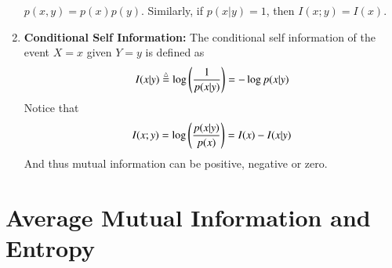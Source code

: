 \documentclass[journal,12pt,twocolumn]{IEEEtran}
\renewcommand\thesection{\arabic{section}}
\begin{document}
\begin{enumerate}[label=\thesection.\arabic*, ref=\thesection.\theenumi]
    $p(x,y) = p(x)p(y)$. Similarly, if $p(x|y) = 1$, then $I(x;y) = I(x)$.
    \item \textbf{Conditional Self Information:} The conditional self information 
    of the event $X = x$ given $Y = y$ is defined as
    \begin{align}
        I(x|y) \stackrel{\triangle}{=} \log\left(\frac{1}{p(x|y)}\right) = -\log p(x|y)
        \label{eq:conditional-self-info}
    \end{align}
    Notice that
    \begin{align}
        I(x;y) = \log\left(\frac{p(x|y)}{p(x)}\right) = I(x) - I(x|y)
        \label{eq:cond-mutual-self-info}
    \end{align}
    And thus mutual information can be positive, negative or zero.
\end{enumerate}

\section{Average Mutual Information and Entropy}
\end{document}

